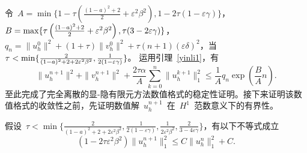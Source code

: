 \documentclass[twoside,UTF8]{nputhesis}
\begin{document}
令~$A=\min\{1-\tau\left(\frac{(1-a)^2+2}{2}+\varepsilon^2\beta^2\right),1-2\tau(1-\varepsilon\gamma)\}$，
$B=\max\{\tau\left(\frac{(1-a)^2+2}{2}+\varepsilon^2\beta^2\right),\\\tau(3-2\varepsilon\gamma)\}$，$q_n=\parallel u^0_h\parallel^2+(1+\tau)\parallel v^0_h\parallel^2+\tau(n+1)(\varepsilon\delta)^2$，当 ~$\tau<\min\{\frac{2}{(1-a)^2+2+2\varepsilon^2\beta^2},\\\frac{1}{2(1-\varepsilon\gamma)}\}$。
运用引理~\ref{yinli1}，有
\begin{equation*}
\parallel u^{n+1}_h\parallel^2+\parallel v^{n+1}_h\parallel^2+\frac{2\tau\alpha}{A}\sum^n_{k=0}\parallel u^{k+1}_h\parallel^2_1\leq \frac{1}{A}q_n\exp(\frac{B}{A}n).
\end{equation*}
至此完成了完全离散的显-隐有限元方法数值格式的稳定性证明。接下来证明该数值格式的收敛性之前，先证明数值解~$u_h^{n+1}$~在~$H^1$~范数意义下的有界性。
\begin{theorem}
	假设~$\tau<\min\{\frac{2}{(1-a)^2+2+2\varepsilon^2\beta^2},\frac{1}{2(1-\varepsilon\gamma)},\frac{1}{2\varepsilon^2\beta^2},\frac{2}{3-4\varepsilon\gamma}\}$，有以下不等式成立
	\begin{equation*}
	(1-2\tau\varepsilon^2\beta^2)\|u^{n+1}_h\|^2_{1}\leq C\|u^n_h\|^2_{1}+C.
	\label{13}
	\end{equation*}
	\label{thm2}
\end{theorem}
\end{document}
